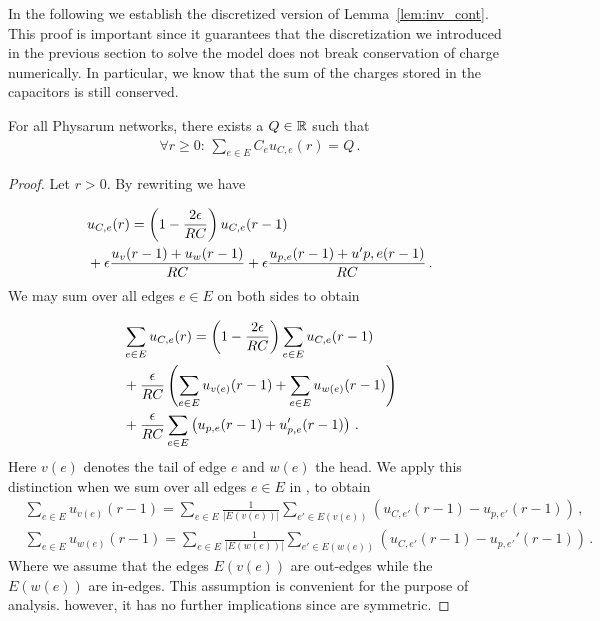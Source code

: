 In the following we establish the discretized version of Lemma~\ref{lem:inv_cont}. This proof is important since it guarantees that the discretization we introduced in the previous section to solve the model does not break conservation of charge numerically. In particular, we know that the sum of the charges stored in the capacitors is still conserved.

\begin{lem}\label{cor:inv_disc}
For all Physarum networks, there exists a $Q \in \mathbb{R}$ such that
\begin{align}
\forall r \ge 0:\,\sum_{e \in E}C_e u_{C,e}(r) = Q\,.
\end{align}
\end{lem}

\begin{proof}
Let $r > 0$. By rewriting  we have

\begin{align}
&u_{C,e}(r) = \left( 1 - \frac{2 \epsilon}{RC}\right) u_{C,e}(r - 1)  \\\notag
&+\epsilon \frac{u_v(r - 1) + u_w(r-1)}{RC} + \epsilon \frac{u_{p,e}(r-1) + u'{p,e}(r - 1)}{RC}\,.
\end{align}
We may sum over all edges $e \in E$ on both sides to obtain

\begin{align}\label{eq:key}
&\sum_{e\in E} u_{C,e}(r) = \left( 1 - \frac{2 \epsilon}{RC}\right) \sum_{e\in E} u_{C,e}(r - 1)  \\\notag
&+ \frac{\epsilon}{RC}\left( \sum_{e\in E} u_{v(e)}(r - 1) + \sum_{e\in E} u_{w(e)}(r-1) \right) \\\notag
&+ \frac{\epsilon}{RC} \sum_{e\in E} \left(u_{p,e}(r-1) + u'_{p,e}(r - 1)\right)\,.
\end{align}
Here $v(e)$ denotes the tail of edge $e$ and $w(e)$ the head. We apply this distinction when we sum over all edges $e \in E$ in , to obtain
\begin{align}
&\sum_{e \in E} u_{v(e)}(r-1) = \sum_{e \in E}\frac{1}{|E(v(e))|}\sum_{e' \in E(v(e))}(u_{C,e'}(r-1)-u_{p,e'}(r-1))\,,\label{eq:dis:u:v1}\\
&\sum_{e \in E} u_{w(e)}(r-1) = \sum_{e \in E}\frac{1}{|E(w(e))|}\sum_{e' \in E(w(e))}(u_{C,e'}(r-1)-u_{p,e'}'(r-1))\,.\label{eq:dis:u:w1}
\end{align}
Where we assume that the edges $E(v(e))$ are out-edges while the $E(w(e))$ are in-edges. This assumption is convenient for the purpose of analysis. however, it has no further implications since \Pes are symmetric. 


\end{proof}
